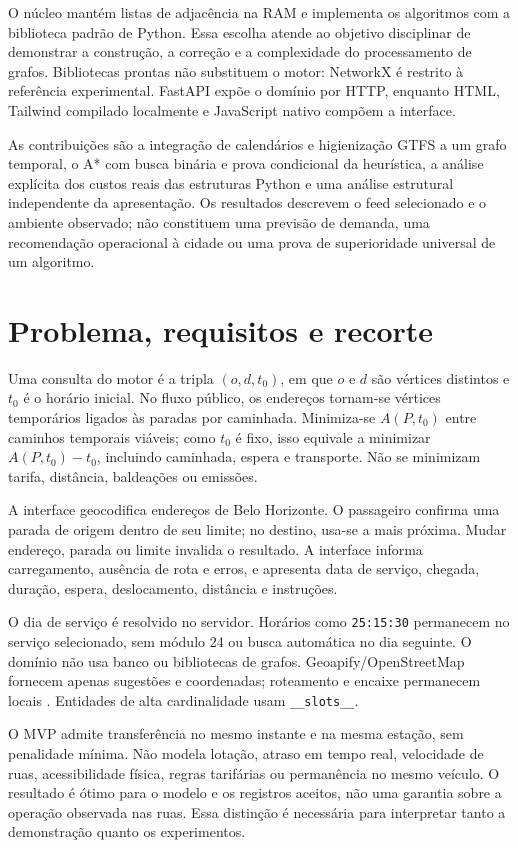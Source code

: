 \documentclass[12pt]{article}
\newcommand{\code}[1]{\texttt{#1}}
\begin{document}
O núcleo mantém listas de adjacência na RAM e implementa os algoritmos com a biblioteca padrão de Python. Essa escolha atende ao objetivo disciplinar de demonstrar a construção, a correção e a complexidade do processamento de grafos. Bibliotecas prontas não substituem o motor: NetworkX é restrito à referência experimental. FastAPI expõe o domínio por HTTP, enquanto HTML, Tailwind compilado localmente e JavaScript nativo compõem a interface.

As contribuições são a integração de calendários e higienização GTFS a um grafo temporal, o A* com busca binária e prova condicional da heurística, a análise explícita dos custos reais das estruturas Python e uma análise estrutural independente da apresentação. Os resultados descrevem o feed selecionado e o ambiente observado; não constituem uma previsão de demanda, uma recomendação operacional à cidade ou uma prova de superioridade universal de um algoritmo.

\section{Problema, requisitos e recorte}
Uma consulta do motor é a tripla $(o,d,t_0)$, em que $o$ e $d$ são vértices distintos e $t_0$ é o horário inicial. No fluxo público, os endereços tornam-se vértices temporários ligados às paradas por caminhada. Minimiza-se $A(P,t_0)$ entre caminhos temporais viáveis; como $t_0$ é fixo, isso equivale a minimizar $A(P,t_0)-t_0$, incluindo caminhada, espera e transporte. Não se minimizam tarifa, distância, baldeações ou emissões.

A interface geocodifica endereços de Belo Horizonte. O passageiro confirma uma parada de origem dentro de seu limite; no destino, usa-se a mais próxima. Mudar endereço, parada ou limite invalida o resultado. A interface informa carregamento, ausência de rota e erros, e apresenta data de serviço, chegada, duração, espera, deslocamento, distância e instruções.

O dia de serviço é resolvido no servidor. Horários como \code{25:15:30} permanecem no serviço selecionado, sem módulo 24 ou busca automática no dia seguinte. O domínio não usa banco ou bibliotecas de grafos. Geoapify/OpenStreetMap fornecem apenas sugestões e coordenadas; roteamento e encaixe permanecem locais \cite{geocoding}. Entidades de alta cardinalidade usam \code{\_\_slots\_\_}.

O MVP admite transferência no mesmo instante e na mesma estação, sem penalidade mínima. Não modela lotação, atraso em tempo real, velocidade de ruas, acessibilidade física, regras tarifárias ou permanência no mesmo veículo. O resultado é ótimo para o modelo e os registros aceitos, não uma garantia sobre a operação observada nas ruas. Essa distinção é necessária para interpretar tanto a demonstração quanto os experimentos.
\end{document}
